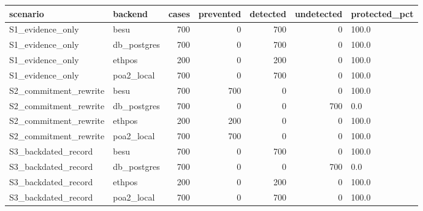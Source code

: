 \begin{tabular}{llrrrrl}
\toprule
scenario & backend & cases & prevented & detected & undetected & protected\_pct \\
\midrule
S1\_evidence\_only & besu & 700 & 0 & 700 & 0 & 100.0 \\
S1\_evidence\_only & db\_postgres & 700 & 0 & 700 & 0 & 100.0 \\
S1\_evidence\_only & ethpos & 200 & 0 & 200 & 0 & 100.0 \\
S1\_evidence\_only & poa2\_local & 700 & 0 & 700 & 0 & 100.0 \\
S2\_commitment\_rewrite & besu & 700 & 700 & 0 & 0 & 100.0 \\
S2\_commitment\_rewrite & db\_postgres & 700 & 0 & 0 & 700 & 0.0 \\
S2\_commitment\_rewrite & ethpos & 200 & 200 & 0 & 0 & 100.0 \\
S2\_commitment\_rewrite & poa2\_local & 700 & 700 & 0 & 0 & 100.0 \\
S3\_backdated\_record & besu & 700 & 0 & 700 & 0 & 100.0 \\
S3\_backdated\_record & db\_postgres & 700 & 0 & 0 & 700 & 0.0 \\
S3\_backdated\_record & ethpos & 200 & 0 & 200 & 0 & 100.0 \\
S3\_backdated\_record & poa2\_local & 700 & 0 & 700 & 0 & 100.0 \\
\bottomrule
\end{tabular}
